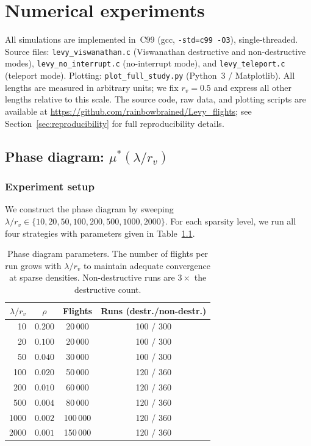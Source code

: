 \chapter{Numerical experiments}
\label{ch:experiments}

All simulations are implemented in~C99 (gcc, \texttt{-std=c99 -O3}),
single-threaded.
Source files: \texttt{levy\_vis\-wa\-na\-than.c} (Viswanathan destructive and non-destructive modes), \texttt{levy\_no\_in\-ter\-rupt.c} (no-interrupt mode), and \texttt{levy\_te\-le\-port.c} (teleport mode).
Plotting: \texttt{plot\_full\_study.py} (Python~3 / Matplotlib).
All lengths are measured in arbitrary units; we fix
$r_v = 0.5$ and express all other lengths relative to this
scale.  The source code, raw data, and plotting scripts are
available at
\url{https://github.com/rainbowbrained/Levy_flights};
see Section~\ref{sec:reproducibility} for full reproducibility
details.

\section{Phase diagram: $\mu^*(\lambda/r_v)$}
\label{sec:phase_diagram}

\subsection{Experiment setup}

We construct the phase diagram by sweeping
$\lambda/r_v \in \{10, 20, 50, 100, 200, 500, 1000, 2000\}$.
For each sparsity level, we run all four strategies with
parameters given in Table~\ref{tab:phase_params}.

\begin{table}[htb]
\centering
\begin{tabular}{rccc}
\toprule
$\lambda/r_v$ & $\rho$ & Flights & Runs (destr./non-destr.) \\
\midrule
   10 & $0.200$ &  20\,000 & 100 / 300 \\
   20 & $0.100$ &  20\,000 & 100 / 300 \\
   50 & $0.040$ &  30\,000 & 100 / 300 \\
  100 & $0.020$ &  50\,000 & 120 / 360 \\
  200 & $0.010$ &  60\,000 & 120 / 360 \\
  500 & $0.004$ &  80\,000 & 120 / 360 \\
 1000 & $0.002$ & 100\,000 & 120 / 360 \\
 2000 & $0.001$ & 150\,000 & 120 / 360 \\
\bottomrule
\end{tabular}
\caption{Phase diagram parameters.  The number of flights per
         run grows with $\lambda/r_v$ to maintain
         adequate convergence at sparse densities.
         Non-destructive runs are $3\times$ the destructive
         count.}
\label{tab:phase_params}
\end{table}

